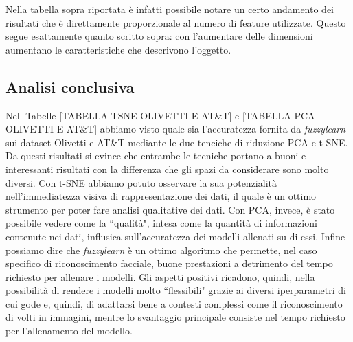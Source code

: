 \documentclass[12pt,italian]{report}
\begin{document}
Nella tabella sopra riportata è infatti possibile notare un certo andamento dei risultati che è direttamente proporzionale al numero di feature utilizzate. Questo segue esattamente quanto scritto sopra: con l'aumentare delle dimensioni aumentano le caratteristiche che descrivono l'oggetto.

\subsection{Analisi conclusiva}
Nell Tabelle [TABELLA TSNE OLIVETTI E AT\&T] e [TABELLA PCA OLIVETTI E AT\&T] abbiamo visto quale sia l'accuratezza fornita da \emph{fuzzylearn} sui dataset Olivetti e AT\&T mediante le due tenciche di riduzione PCA e t-SNE. Da questi risultati si evince che entrambe le tecniche portano a buoni e interessanti risultati con la differenza che gli spazi da considerare sono molto diversi. Con t-SNE abbiamo potuto osservare la sua potenzialità nell'immediatezza visiva di rappresentazione dei dati, il quale è un ottimo strumento per poter fare analisi qualitative dei dati. Con PCA, invece, è stato possibile vedere come la ``qualità", intesa come la quantità di informazioni contenute nei dati, influsica sull'accuratezza dei modelli allenati su di essi. Infine possiamo dire che \emph{fuzzylearn} è un ottimo algoritmo che permette, nel caso specifico di riconoscimento facciale, buone prestazioni a detrimento del tempo richiesto per allenare i modelli. Gli aspetti positivi ricadono, quindi, nella possibilità di rendere i modelli molto ``flessibili" grazie ai diversi iperparametri di cui gode e, quindi, di adattarsi bene a contesti complessi come il riconoscimento di volti in immagini, mentre lo svantaggio principale consiste nel tempo richiesto per l'allenamento del modello.
\end{document}
